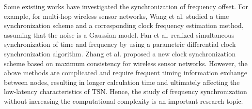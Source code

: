 \documentclass[conference]{IEEEtran}
\begin{document}
Some existing works have investigated the synchronization of frequency offset. For example, for multi-hop wireless sensor networks, Wang et al. \cite{ref9} studied a time synchronization scheme and a corresponding clock frequency estimation method, assuming that the noise is a Gaussian model. Fan et al. \cite{ref10} realized simultaneous synchronization of time and frequency by using a parametric differential clock synchronization algorithm. Zhang et al. \cite{ref11} proposed a new clock synchronization scheme based on maximum consistency for wireless sensor networks. However, the above methods are complicated and require frequent timing information exchange between nodes, resulting in longer calculation time and ultimately affecting the low-latency characteristics of TSN. Hence, the study of frequency synchronization without increasing the computational complexity is an important research topic.


\end{document}
